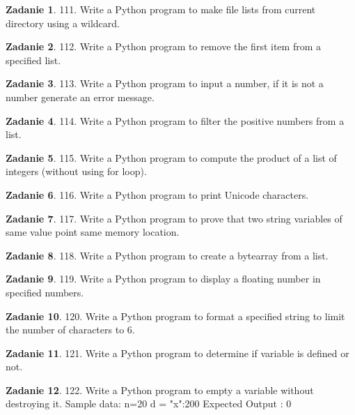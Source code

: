 \documentclass[11pt]{article}
\theoremstyle{definition}
\newtheorem{zadanie}{Zadanie}
\begin{document}
\begin{zadanie}
111. Write a Python program to make file lists from current directory using a wildcard.
\end{zadanie}

\begin{zadanie}
112. Write a Python program to remove the first item from a specified list.
\end{zadanie}

\begin{zadanie}
113. Write a Python program to input a number, if it is not a number generate an error message.
\end{zadanie}

\begin{zadanie}
114. Write a Python program to filter the positive numbers from a list.
\end{zadanie}

\begin{zadanie}
115. Write a Python program to compute the product of a list of integers (without using for loop).
\end{zadanie}

\begin{zadanie}
116. Write a Python program to print Unicode characters.
\end{zadanie}

\begin{zadanie}
117. Write a Python program to prove that two string variables of same value point same memory location.
\end{zadanie}

\begin{zadanie}
118. Write a Python program to create a bytearray from a list.
\end{zadanie}

\begin{zadanie}
119. Write a Python program to display a floating number in specified numbers.
\end{zadanie}

\begin{zadanie}
120. Write a Python program to format a specified string to limit the number of characters to 6.
\end{zadanie}

\begin{zadanie}
121. Write a Python program to determine if variable is defined or not.
\end{zadanie}

\begin{zadanie}
122. Write a Python program to empty a variable without destroying it.
Sample data: n=20
d = {"x":200}
Expected Output : 0
	{}
\end{zadanie}
\end{document}
